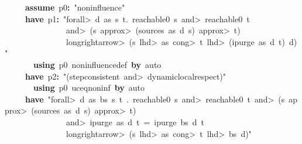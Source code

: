 \documentclass{article}
\newcommand{\syntaxKEYWORDA}[1]{\textcolor[rgb]{0.0,0.4,0.6}{\textbf{#1}}}
\newcommand{\syntaxKEYWORDC}[1]{\textcolor[rgb]{0.0,0.6,1.0}{\textbf{#1}}}
\newcommand{\syntaxLITERALA}[1]{\textcolor[rgb]{1.0,0.0,0.8}{#1}}
\newcommand{\syntaxOPERATOR}[1]{\textcolor[rgb]{0.0,0.0,0.0}{\textbf{#1}}}
\newcommand{\syntaxKEYWORDA}[1]{\textcolor[rgb]{0.0,0.4,0.6}{\textbf{#1}}}
\newcommand{\syntaxKEYWORDC}[1]{\textcolor[rgb]{0.0,0.6,1.0}{\textbf{#1}}}
\newcommand{\syntaxLITERALA}[1]{\textcolor[rgb]{1.0,0.0,0.8}{#1}}
\newcommand{\syntaxOPERATOR}[1]{\textcolor[rgb]{0.0,0.0,0.0}{\textbf{#1}}}
\newcommand{\syntaxKEYWORDA}[1]{\textcolor[rgb]{0.0,0.4,0.6}{\textbf{#1}}}
\newcommand{\syntaxKEYWORDC}[1]{\textcolor[rgb]{0.0,0.6,1.0}{\textbf{#1}}}
\newcommand{\syntaxLITERALA}[1]{\textcolor[rgb]{1.0,0.0,0.8}{#1}}
\newcommand{\syntaxOPERATOR}[1]{\textcolor[rgb]{0.0,0.0,0.0}{\textbf{#1}}}
\newcommand{\syntaxKEYWORDA}[1]{\textcolor[rgb]{0.0,0.4,0.6}{#1}}
\newcommand{\syntaxKEYWORDC}[1]{\textcolor[rgb]{0.0,0.6,1.0}{#1}}
\newcommand{\syntaxLITERALA}[1]{\textcolor[rgb]{1.0,0.0,0.8}{\textbf{#1}}}
\newcommand{\syntaxOPERATOR}[1]{\textcolor[rgb]{0.0,0.0,0.0}{#1}}
\newcommand{\syntaxKEYWORDA}[1]{\textcolor[rgb]{0.0,0.4,0.6}{\textbf{#1}}}
\newcommand{\syntaxKEYWORDC}[1]{\textcolor[rgb]{0.0,0.6,1.0}{\textbf{#1}}}
\newcommand{\syntaxLITERALA}[1]{\textcolor[rgb]{1.0,0.0,0.8}{#1}}
\newcommand{\syntaxOPERATOR}[1]{\textcolor[rgb]{0.0,0.0,0.0}{\textbf{#1}}}
\newcommand{\syntaxKEYWORDA}[1]{\textcolor[rgb]{0.0,0.4,0.6}{\textbf{#1}}}
\newcommand{\syntaxKEYWORDC}[1]{\textcolor[rgb]{0.0,0.6,1.0}{\textbf{#1}}}
\newcommand{\syntaxLITERALA}[1]{\textcolor[rgb]{1.0,0.0,0.8}{#1}}
\newcommand{\syntaxOPERATOR}[1]{\textcolor[rgb]{0.0,0.0,0.0}{\textbf{#1}}}
\begin{document}
{\ }{\ }{\ }{\ }{\ }\syntaxKEYWORDC{assume}{\ }p0\syntaxOPERATOR{:}{\ }\syntaxLITERALA{"noninfluence"}\hspace*{\fill}\\
{\ }{\ }{\ }{\ }{\ }\syntaxKEYWORDA{have}{\ }p1\syntaxOPERATOR{:}{\ }\syntaxLITERALA{"\<forall>{\ }d{\ }as{\ }s{\ }t.{\ }reachable0{\ }s{\ }\<and>{\ }reachable0{\ }t}\hspace*{\fill}\\
\syntaxLITERALA{{\ }{\ }{\ }{\ }{\ }{\ }{\ }{\ }{\ }{\ }{\ }{\ }{\ }{\ }{\ }\<and>{\ }(s{\ }\<approx>{\ }(sources{\ }as{\ }d{\ }s){\ }\<approx>{\ }t){\ }{\ }}\hspace*{\fill}\\
\syntaxLITERALA{{\ }{\ }{\ }{\ }{\ }{\ }{\ }{\ }{\ }{\ }{\ }{\ }{\ }{\ }{\ }\<longrightarrow>{\ }(s{\ }\<lhd>{\ }as{\ }\<cong>{\ }t{\ }\<lhd>{\ }(ipurge{\ }as{\ }d{\ }t){\ }\usebox{\atbox}{\ }d)"}\hspace*{\fill}\\
{\ }{\ }{\ }{\ }{\ }{\ }{\ }\syntaxKEYWORDA{using}{\ }p0{\ }noninfluence\usebox{\underscorebox}def{\ }\syntaxKEYWORDA{by}{\ }auto\hspace*{\fill}\\
{\ }{\ }{\ }{\ }{\ }\syntaxKEYWORDA{have}{\ }p2\syntaxOPERATOR{:}{\ }\syntaxLITERALA{"(step\usebox{\underscorebox}consistent{\ }\<and>{\ }dynamic\usebox{\underscorebox}local\usebox{\underscorebox}respect)"}\hspace*{\fill}\\
{\ }{\ }{\ }{\ }{\ }{\ }{\ }\syntaxKEYWORDA{using}{\ }p0{\ }uc\usebox{\underscorebox}eq\usebox{\underscorebox}noninf{\ }\syntaxKEYWORDA{by}{\ }auto\hspace*{\fill}\\
{\ }{\ }{\ }{\ }{\ }\syntaxKEYWORDA{have}{\ }\syntaxLITERALA{"\<forall>{\ }d{\ }as{\ }bs{\ }s{\ }t{\ }.{\ }reachable0{\ }s{\ }\<and>{\ }reachable0{\ }t{\ }\<and>{\ }(s{\ }\<approx>{\ }(sources{\ }as{\ }d{\ }s){\ }\<approx>{\ }t){\ }}\hspace*{\fill}\\
\syntaxLITERALA{{\ }{\ }{\ }{\ }{\ }{\ }{\ }{\ }{\ }{\ }{\ }{\ }{\ }{\ }{\ }\<and>{\ }ipurge{\ }as{\ }d{\ }t{\ }={\ }ipurge{\ }bs{\ }d{\ }t}\hspace*{\fill}\\
\syntaxLITERALA{{\ }{\ }{\ }{\ }{\ }{\ }{\ }{\ }{\ }{\ }{\ }{\ }{\ }{\ }{\ }\<longrightarrow>{\ }(s{\ }\<lhd>{\ }as{\ }\<cong>{\ }t{\ }\<lhd>{\ }bs{\ }\usebox{\atbox}{\ }d)"}\hspace*{\fill}\\
\end{document}
